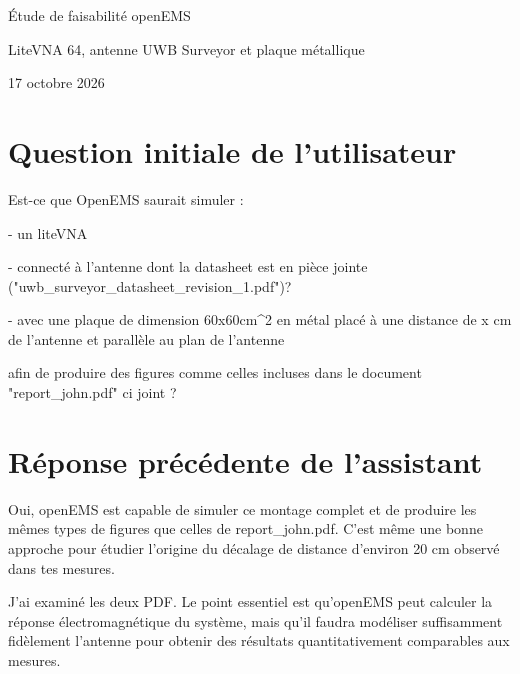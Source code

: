 \documentclass[11pt,a4paper]{article}
\begin{document}
\begin{center}
{\LARGE Étude de faisabilité openEMS}\par
{\large LiteVNA 64, antenne UWB Surveyor et plaque métallique}\par
17 octobre 2026
\end{center}
\tableofcontents\newpage
\section{Question initiale de l’utilisateur}
Est-ce que OpenEMS saurait simuler :\par
\par\medskip
- un liteVNA \par
- connecté à l'antenne dont la datasheet est en pièce jointe ("uwb\_surveyor\_datasheet\_revision\_1.pdf")?\par
- avec une plaque de dimension 60x60cm\textasciicircum{}2 en métal placé à une distance de x cm de l'antenne et parallèle au plan de l'antenne \par
\par\medskip
afin de produire des figures comme celles incluses dans le document "report\_john.pdf" ci joint ?\par
\newpage
\section{Réponse précédente de l’assistant}
Oui, openEMS est capable de simuler ce montage complet et de produire les mêmes types de figures que celles de report\_john.pdf. C'est même une bonne approche pour étudier l'origine du décalage de distance d'environ 20 cm observé dans tes mesures.\par
\par\medskip
J'ai examiné les deux PDF. Le point essentiel est qu'openEMS peut calculer la réponse électromagnétique du système, mais qu'il faudra modéliser suffisamment fidèlement l'antenne pour obtenir des résultats quantitativement comparables aux mesures.\par
\par\medskip
\end{document}
